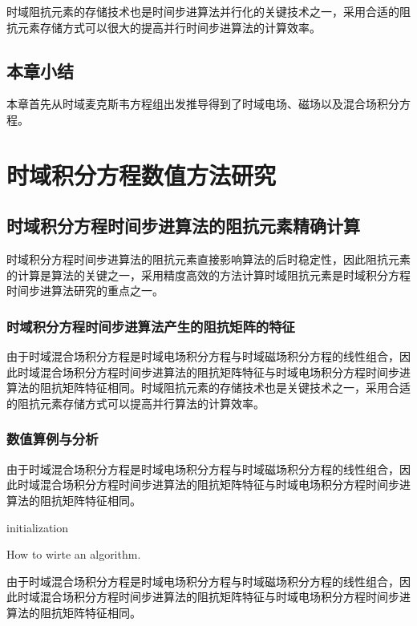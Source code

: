 \documentclass[promaster]{thesis-uestc}
\begin{document}
时域阻抗元素的存储技术也是时间步进算法并行化的关键技术之一，采用合适的阻抗元素存储方式可以很大的提高并行时间步进算法的计算效率。

\section{本章小结}
本章首先从时域麦克斯韦方程组出发推导得到了时域电场、磁场以及混合场积分方程。

\chapter{时域积分方程数值方法研究}
\section{时域积分方程时间步进算法的阻抗元素精确计算}
时域积分方程时间步进算法的阻抗元素直接影响算法的后时稳定性，因此阻抗元素的计算是算法的关键之一，采用精度高效的方法计算时域阻抗元素是时域积分方程时间步进算法研究的重点之一。

\subsection{时域积分方程时间步进算法产生的阻抗矩阵的特征}
由于时域混合场积分方程是时域电场积分方程与时域磁场积分方程的线性组合，因此时域混合场积分方程时间步进算法的阻抗矩阵特征与时域电场积分方程时间步进算法的阻抗矩阵特征相同。时域阻抗元素的存储技术也是关键技术之一，采用合适的阻抗元素存储方式可以提高并行算法的计算效率。

\subsection{数值算例与分析}
由于时域混合场积分方程是时域电场积分方程与时域磁场积分方程的线性组合，因此时域混合场积分方程时间步进算法的阻抗矩阵特征与时域电场积分方程时间步进算法的阻抗矩阵特征相同。

\begin{algorithm}[H]
    initialization\;
    \caption{How to wirte an algorithm.}
\end{algorithm}

由于时域混合场积分方程是时域电场积分方程与时域磁场积分方程的线性组合，因此时域混合场积分方程时间步进算法的阻抗矩阵特征与时域电场积分方程时间步进算法的阻抗矩阵特征相同。
\end{document}
